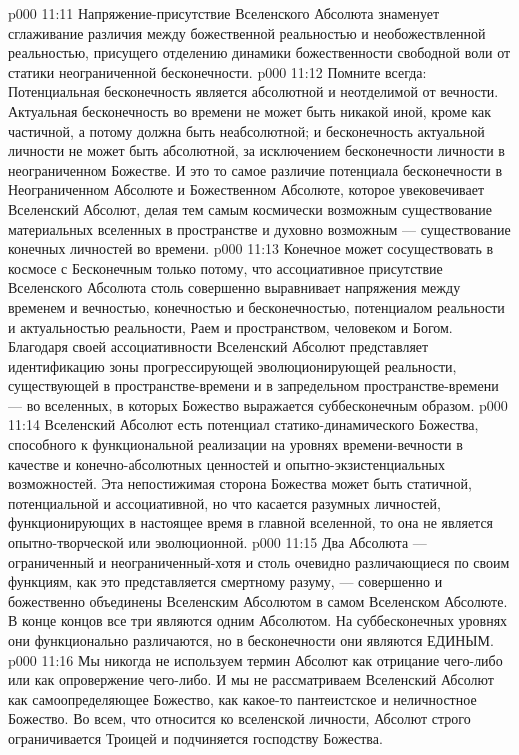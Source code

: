 \vs p000 11:11 \pc Напряжение\hyp{}присутствие Вселенского Абсолюта знаменует сглаживание различия между божественной реальностью и необожествленной реальностью, присущего отделению динамики божественности свободной воли от статики неограниченной бесконечности.
\vs p000 11:12 \pc Помните всегда: Потенциальная бесконечность является абсолютной и неотделимой от вечности. Актуальная бесконечность во времени не может быть никакой иной, кроме как частичной, а потому должна быть неабсолютной; и бесконечность актуальной личности не может быть абсолютной, за исключением бесконечности личности в неограниченном Божестве. И это то самое различие потенциала бесконечности в Неограниченном Абсолюте и Божественном Абсолюте, которое увековечивает Вселенский Абсолют, делая тем самым космически возможным существование материальных вселенных в пространстве и духовно возможным --- существование конечных личностей во времени.
\vs p000 11:13 Конечное может сосуществовать в космосе с Бесконечным только потому, что ассоциативное присутствие Вселенского Абсолюта столь совершенно выравнивает напряжения между временем и вечностью, конечностью и бесконечностью, потенциалом реальности и актуальностью реальности, Раем и пространством, человеком и Богом. Благодаря своей ассоциативности Вселенский Абсолют представляет идентификацию зоны прогрессирующей эволюционирующей реальности, существующей в пространстве\hyp{}времени и в запредельном пространстве\hyp{}времени --- во вселенных, в которых Божество выражается суббесконечным образом.
\vs p000 11:14 Вселенский Абсолют есть потенциал статико\hyp{}динамического Божества, способного к функциональной реализации на уровнях времени\hyp{}вечности в качестве и конечно\hyp{}абсолютных ценностей и опытно\hyp{}экзистенциальных возможностей. Эта непостижимая сторона Божества может быть статичной, потенциальной и ассоциативной, но что касается разумных личностей, функционирующих в настоящее время в главной вселенной, то она не является опытно\hyp{}творческой или эволюционной.
\vs p000 11:15 \pc {} Два Абсолюта --- ограниченный и неограниченный\hyp{}хотя и столь очевидно различающиеся по своим функциям, как это представляется смертному разуму, --- совершенно и божественно объединены Вселенским Абсолютом в самом Вселенском Абсолюте. В конце концов все три являются одним Абсолютом. На суббесконечных уровнях они функционально различаются, но в бесконечности они являются ЕДИНЫМ.
\vs p000 11:16 \pc Мы никогда не используем термин Абсолют как отрицание чего\hyp{}либо или как опровержение чего\hyp{}либо. И мы не рассматриваем Вселенский Абсолют как самоопределяющее Божество, как какое\hyp{}то пантеистское и неличностное Божество. Во всем, что относится ко вселенской личности, Абсолют строго ограничивается Троицей и подчиняется господству Божества.

